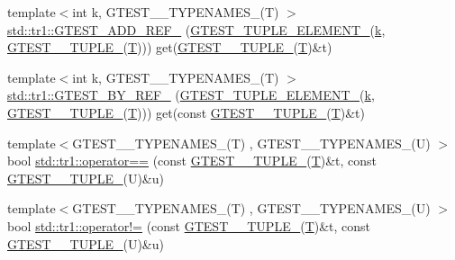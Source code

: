 \begin{DoxyCompactItemize}
{\footnotesize template$<$int k, G\+T\+E\+S\+T\+\_\+\_\+\+T\+Y\+P\+E\+N\+A\+M\+E\+S\+\_\+(\+T) $>$ }\\\hyperlink{namespacestd_1_1tr1_ad0769041710d18b917067576f84b0303}{std\+::tr1\+::\+G\+T\+E\+S\+T\+\_\+\+A\+D\+D\+\_\+\+R\+E\+F\+\_\+} (\hyperlink{gtest-tuple_8h_a1b7f133d8aa02e0b7afed7b66781eeb7}{G\+T\+E\+S\+T\+\_\+\+T\+U\+P\+L\+E\+\_\+\+E\+L\+E\+M\+E\+N\+T\+\_\+}(\hyperlink{jquery_8js_ab26645c014aa005ecedef329ecf58c99}{k}, \hyperlink{gtest-tuple_8h_a275e7bcd84299cc44b9c1dba971951c4}{G\+T\+E\+S\+T\+\_\+\_\+\+T\+U\+P\+L\+E\+\_\+}(\hyperlink{functions__7_8js_adf1f3edb9115acb0a1e04209b7a9937b}{T}))) get(\hyperlink{gtest-tuple_8h_a275e7bcd84299cc44b9c1dba971951c4}{G\+T\+E\+S\+T\+\_\+\_\+\+T\+U\+P\+L\+E\+\_\+}(\hyperlink{functions__7_8js_adf1f3edb9115acb0a1e04209b7a9937b}{T})\&t)
\item 
{\footnotesize template$<$int k, G\+T\+E\+S\+T\+\_\+\_\+\+T\+Y\+P\+E\+N\+A\+M\+E\+S\+\_\+(\+T) $>$ }\\\hyperlink{namespacestd_1_1tr1_a7c131d0c2462612a78012be16114f61d}{std\+::tr1\+::\+G\+T\+E\+S\+T\+\_\+\+B\+Y\+\_\+\+R\+E\+F\+\_\+} (\hyperlink{gtest-tuple_8h_a1b7f133d8aa02e0b7afed7b66781eeb7}{G\+T\+E\+S\+T\+\_\+\+T\+U\+P\+L\+E\+\_\+\+E\+L\+E\+M\+E\+N\+T\+\_\+}(\hyperlink{jquery_8js_ab26645c014aa005ecedef329ecf58c99}{k}, \hyperlink{gtest-tuple_8h_a275e7bcd84299cc44b9c1dba971951c4}{G\+T\+E\+S\+T\+\_\+\_\+\+T\+U\+P\+L\+E\+\_\+}(\hyperlink{functions__7_8js_adf1f3edb9115acb0a1e04209b7a9937b}{T}))) get(const \hyperlink{gtest-tuple_8h_a275e7bcd84299cc44b9c1dba971951c4}{G\+T\+E\+S\+T\+\_\+\_\+\+T\+U\+P\+L\+E\+\_\+}(\hyperlink{functions__7_8js_adf1f3edb9115acb0a1e04209b7a9937b}{T})\&t)
\item 
{\footnotesize template$<$G\+T\+E\+S\+T\+\_\+\_\+\+T\+Y\+P\+E\+N\+A\+M\+E\+S\+\_\+(\+T) , G\+T\+E\+S\+T\+\_\+\_\+\+T\+Y\+P\+E\+N\+A\+M\+E\+S\+\_\+(\+U) $>$ }\\bool \hyperlink{namespacestd_1_1tr1_af4516de784404381f9b14797694b6311}{std\+::tr1\+::operator==} (const \hyperlink{gtest-tuple_8h_a275e7bcd84299cc44b9c1dba971951c4}{G\+T\+E\+S\+T\+\_\+\_\+\+T\+U\+P\+L\+E\+\_\+}(\hyperlink{functions__7_8js_adf1f3edb9115acb0a1e04209b7a9937b}{T})\&t, const \hyperlink{gtest-tuple_8h_a275e7bcd84299cc44b9c1dba971951c4}{G\+T\+E\+S\+T\+\_\+\_\+\+T\+U\+P\+L\+E\+\_\+}(U)\&u)
\item 
{\footnotesize template$<$G\+T\+E\+S\+T\+\_\+\_\+\+T\+Y\+P\+E\+N\+A\+M\+E\+S\+\_\+(\+T) , G\+T\+E\+S\+T\+\_\+\_\+\+T\+Y\+P\+E\+N\+A\+M\+E\+S\+\_\+(\+U) $>$ }\\bool \hyperlink{namespacestd_1_1tr1_a058882c51de469b5e78d29076f864940}{std\+::tr1\+::operator!=} (const \hyperlink{gtest-tuple_8h_a275e7bcd84299cc44b9c1dba971951c4}{G\+T\+E\+S\+T\+\_\+\_\+\+T\+U\+P\+L\+E\+\_\+}(\hyperlink{functions__7_8js_adf1f3edb9115acb0a1e04209b7a9937b}{T})\&t, const \hyperlink{gtest-tuple_8h_a275e7bcd84299cc44b9c1dba971951c4}{G\+T\+E\+S\+T\+\_\+\_\+\+T\+U\+P\+L\+E\+\_\+}(U)\&u)
\end{DoxyCompactItemize}
